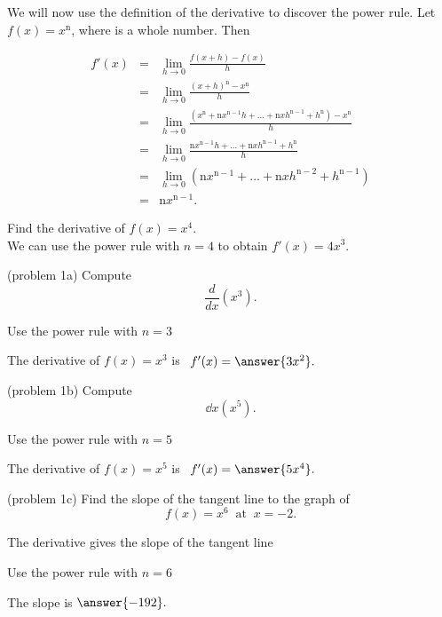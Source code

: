 \documentclass[handout]{ximera}
\begin{document}
We will now use the definition of the derivative to discover the power rule. 
Let $f(x) = x^\text{n}$, where  is a whole number. Then

\begin{eqnarray*}
f'(x) &=& \lim_{h\to 0} \frac{f(x+h)-f(x)}{h}\\[10 pt] 
&=& \lim_{h\to 0} \frac{(x+h)^\text{n}-x^\text{n}}{h}\\[10 pt]
&=& \lim_{h\to 0} \frac{\left(x^\text{n} + \text{n}x^{\text{n}-1}h + \dots + \text{n}xh^{\text{n}-1} + h^\text{n}\right)-x^\text{n}}{h}\\[10 pt]
 &=& \lim_{h\to 0} \frac{\text{n}x^{\text{n}-1}h + \dots + \text{n}xh^{\text{n}-1} + h^\text{n}}{h} \\[10 pt]
 &=& \lim_{h\to 0} \left(\text{n}x^{\text{n}-1} + \dots + \text{n}xh^{\text{n}-2} + h^{\text{n}-1}\right) \\[10 pt] 
 &=& \text{n}x^{\text{n}-1}.
 \end{eqnarray*}




\begin{example}[example 1]
Find the derivative of  $f(x) = x^4$.\\
We can use the power rule with $n = 4$ to obtain $f'(x) = 4x^3.$
\end{example}



\begin{problem}(problem 1a)
Compute
\[
\frac{d}{dx} \left(x^3\right).
\]
\begin{hint}
Use the power rule with $n = 3$
\end{hint}
\begin{prompt}
The derivative of $f(x) = x^3$ is \ $f'(x) = \answer{3x^2}.$
\end{prompt}
\end{problem}



\begin{problem}(problem 1b)
Compute
\[
\dd{x} \left(x^5\right).
\]
\begin{hint}
Use the power rule with $n = 5$
\end{hint}
The derivative of $f(x) = x^5$ is \ $f'(x) = \answer{5x^4}.$
\end{problem}



\begin{problem}(problem 1c)
Find the slope of the tangent line to the graph of 
\[
f(x) = x^6  \;\; \text{at} \;\; x = -2.
\]
\begin{hint}
The derivative gives the slope of the tangent line
\end{hint}
\begin{hint}
Use the power rule with $n = 6$
\end{hint}
The slope is  $\answer{-192}.$
\end{problem}
\end{document}
